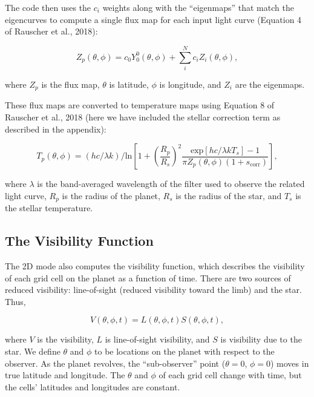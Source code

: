 \documentclass[12pt]{article}
\begin{document}
The code then uses the $c_i$ weights along with the ``eigenmaps''
that match the eigencurves to compute a single flux map for each input
light curve (Equation 4 of Rauscher et al., 2018):

\begin{equation}
  Z_p(\theta, \phi) = c_0 Y_0^0(\theta, \phi) + \sum_i^Nc_iZ_i(\theta, \phi),
\end{equation}

\noindent
where $Z_p$ is the flux map, $\theta$ is latitude, $\phi$ is longitude,
and $Z_i$ are the eigenmaps.

These flux maps are converted to temperature maps using Equation 8 of
Rauscher et al., 2018 (here we have included the stellar correction
term as described in the appendix):

\begin{equation}
  T_p(\theta, \phi) = (hc / \lambda k) / \textrm{ln} \left[1 + \left(\frac{R_p}{R_s}\right)^2 \frac{\textrm{exp}[hc/\lambda k T_s] - 1}{\pi Z_p(\theta, \phi) (1 + s_{\textrm{corr}})}\right],
\end{equation}

\noindent
where $\lambda$ is the band-averaged wavelength of the filter used to observe
the related light curve, $R_p$ is the radius of the planet, $R_s$ is the
radius of the star, and $T_s$ is the stellar temperature.

\subsection{The Visibility Function}

The 2D mode also computes the visibility function, which describes the
visibility of each grid cell on the planet as a function of
time. There are two sources of reduced visibility: line-of-sight
(reduced visibility toward the limb) and the star. Thus,

\begin{equation}
  V(\theta, \phi, t) = L(\theta, \phi, t) S(\theta, \phi, t),
\end{equation}

\noindent
where $V$ is the visibility, $L$ is line-of-sight visibility, and $S$
is visibility due to the star. We define $\theta$ and $\phi$ to be
locations on the planet with respect to the observer. As the planet
revolves, the ``sub-observer'' point ($\theta = 0$, $\phi = 0$) moves
in true latitude and longitude. The $\theta$ and $\phi$ of each grid
cell change with time, but the cells' latitudes and longitudes are
constant.
\end{document}
